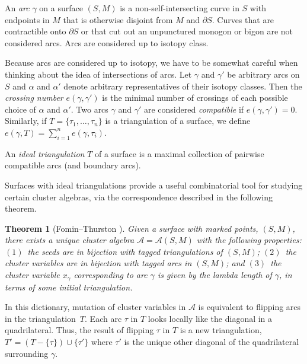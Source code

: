 \documentclass[pdftex]{sigma}%
\numberwithin{equation}{section}
\newtheorem{Theorem}{Theorem}[section]
\begin{document}
\begin{Definition}An \emph{arc} $\gamma$ on a surface $(S,M)$ is a non-self-intersecting curve in $S$ with endpoints in $M$ that is otherwise disjoint from $M$ and $\partial S$. Curves that are contractible onto $\partial S$ or that cut out an unpunctured monogon or bigon are not considered arcs. Arcs are considered up to isotopy class.
\end{Definition}

Because arcs are considered up to isotopy, we have to be somewhat careful when thinking about the idea of intersections of arcs. Let $\gamma$ and $\gamma'$ be arbitrary arcs on $S$ and $\alpha$ and $\alpha'$ denote arbitrary representatives of their isotopy classes. Then the \emph{crossing number} $e(\gamma,\gamma')$ is the minimal number of crossings of each possible choice of $\alpha$ and $\alpha'$. Two arcs $\gamma$ and $\gamma'$ are considered \emph{compatible} if $e(\gamma,\gamma') = 0.$ Similarly, if $T = \{\tau_1,\ldots,\tau_n\}$ is a triangulation of a surface, we define $e(\gamma,T) = \sum_{i=1}^n e(\gamma, \tau_i)$.

\begin{Definition}
An \emph{ideal triangulation} $T$ of a surface is a maximal collection of pairwise compatible arcs (and boundary arcs).
\end{Definition}

Surfaces with ideal triangulations provide a useful combinatorial tool for studying certain cluster algebras, via the correspondence described in the following theorem.

\begin{Theorem}[Fomin--Thurston \cite{FT-II}]\label{SurfaceCA}
Given a surface with marked points, $(S,M)$, there exists a unique cluster algebra $\mathcal{A} = \mathcal{A}(S,M)$ with the following properties: $(1)$~the seeds are in bijection with tagged triangulations of $(S,M)$;
$(2)$~the cluster variables are in bijection with tagged arcs in $(S,M)$; and $(3)$~the cluster variable $x_\gamma$ corresponding to arc $\gamma$ is given by the lambda length of $\gamma$, in terms of some initial triangulation.
\end{Theorem}
 In this dictionary, mutation of cluster variables in $\mathcal{A}$ is equivalent to flipping arcs in the triangulation~$T$. Each arc $\tau$ in $T$ looks locally like the diagonal in a quadrilateral. Thus, the result of flipping $\tau$ in $T$ is a new triangulation, $T' = (T - \{\tau\}) \cup \{\tau' \}$ where $\tau'$ is the unique other diagonal of the quadrilateral surrounding $\gamma$.
\end{document}
